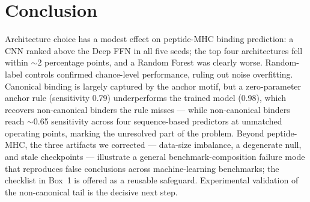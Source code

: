 \section{Conclusion}\label{sec:conclusion}

Architecture choice has a modest effect on peptide-MHC binding prediction: a CNN ranked above the Deep FFN in all five seeds; the top four architectures fell within $\sim$2 percentage points, and a Random Forest was clearly worse. Random-label controls confirmed chance-level performance, ruling out noise overfitting. Canonical binding is largely captured by the anchor motif, but a zero-parameter anchor rule (sensitivity 0.79) underperforms the trained model (0.98), which recovers non-canonical binders the rule misses --- while non-canonical binders reach $\sim$0.65 sensitivity across four sequence-based predictors at unmatched operating points, marking the unresolved part of the problem. Beyond peptide-MHC, the three artifacts we corrected --- data-size imbalance, a degenerate null, and stale checkpoints --- illustrate a general benchmark-composition failure mode that reproduces false conclusions across machine-learning benchmarks; the checklist in Box~1 is offered as a reusable safeguard. Experimental validation of the non-canonical tail is the decisive next step.
